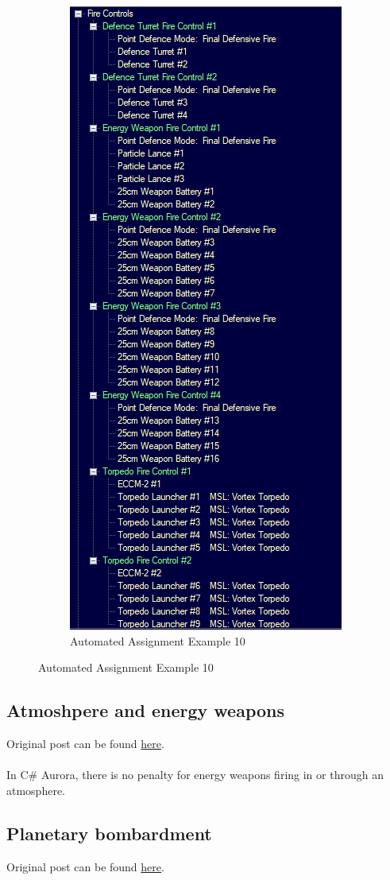 \documentclass[../Aurora C# unofficial manual.tex]{subfiles}
\begin{document}
\begin{figure}[H]
\begin{subfigure}{.5\textwidth}
			\includegraphics[width=0.5\linewidth]{images/AutomatedAssignment10}
			\caption[Automated Assignment]{Automated Assignment Example 10}
			\label{fig:automatedassignment10}
		\end{subfigure}
	\end{figure}


	\subsection{Atmoshpere and energy weapons}
	Original post can be found
	\href{http://aurora2.pentarch.org/index.php?topic=8495.msg107702#msg107702}{here}.
	\\\\
	
	In C\# Aurora, there is no penalty for energy weapons firing in or through an atmosphere.
	
	
	\subsection{Planetary bombardment}
	Original post can be found
	\href{http://aurora2.pentarch.org/index.php?topic=8495.msg107703#msg107703}{here}.
	\\\\
	
\end{document}
